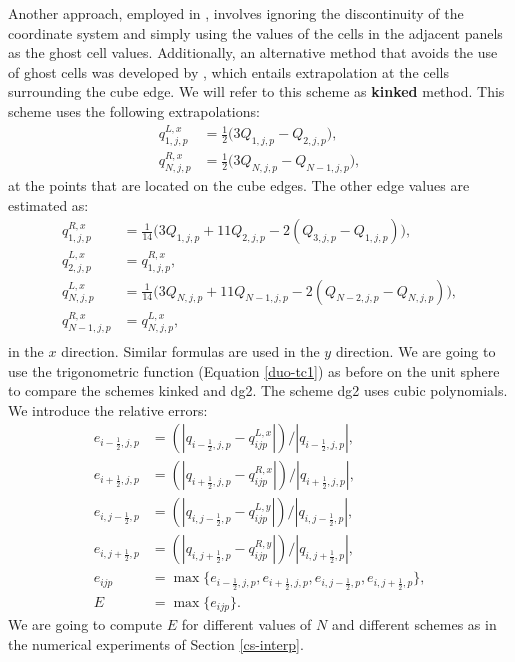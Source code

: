 Another approach, employed in \citet{sadourny:1972}, involves ignoring the
discontinuity of the coordinate system and simply using the values of the cells 
in the adjacent panels as the ghost cell values. 
Additionally, an alternative method that avoids the use of ghost cells was developed by
\citet{putman:2007}, which entails extrapolation at the cells surrounding the cube edge.
We will refer to this scheme as \textbf{kinked} method.
This scheme uses the following extrapolations:
\begin{align*}
	q^{L,x}_{1,j,p} &= \frac{1}{2}\bigg(3Q_{1,j,p} - Q_{2,j,p}\bigg),\\
	q^{R,x}_{N,j,p} &= \frac{1}{2}\bigg(3Q_{N,j,p} - Q_{N-1,j,p}\bigg),
\end{align*}
at the points that are located on the cube edges. The other edge values are estimated as:
\begin{align*}
	q^{R,x}_{1,j,p} &= \frac{1}{14}\bigg(3Q_{1,j,p} + 11Q_{2,j,p} - 2(Q_{3,j,p} - Q_{1,j,p})\bigg),\\
	q^{L,x}_{2,j,p} &= q^{R,x}_{1,j,p},\\
	q^{L,x}_{N,j,p} &= \frac{1}{14}\bigg(3Q_{N,j,p} + 11Q_{N-1,j,p} - 2(Q_{N-2,j,p} - Q_{N,j,p})\bigg),\\
	q^{R,x}_{N-1,j,p} &= q^{L,x}_{N,j,p},\\
\end{align*}
in the $x$ direction. Similar formulas are used in the $y$ direction.
We are going to use the trigonometric function (Equation \eqref{duo-tc1})
as before on the unit sphere to compare the schemes kinked and dg2. The scheme dg2 uses cubic polynomials.
We introduce the relative errors:
\begin{align*}
	e_{{i-\frac{1}{2}},j,p} &= (|q_{{i-\frac{1}{2}},j,p} - q^{L,x}_{ijp}|)/|q_{{i-\frac{1}{2}},j,p}|,\\
	e_{{i+\frac{1}{2}},j,p} &= (|q_{{i+\frac{1}{2}},j,p} - q^{R,x}_{ijp}|)/|q_{{i+\frac{1}{2}},j,p}|,\\
	e_{i,{j-\frac{1}{2}},p} &= (|q_{i,{j-\frac{1}{2}},p} - q^{L,y}_{ijp}|)/|q_{i,{j-\frac{1}{2}},p}|,\\
	e_{i,{j+\frac{1}{2}},p} &= (|q_{i,{j+\frac{1}{2}},p} - q^{R,y}_{ijp}|)/|q_{i,{j+\frac{1}{2}},p}|,\\
	e_{ijp} &= \max\{e_{{i-\frac{1}{2}},j,p}, e_{{i+\frac{1}{2}},j,p} , e_{i,{j-\frac{1}{2}},p}, e_{i,{j+\frac{1}{2}},p} \},\\
	E &= \max \{e_{ijp}\}.
\end{align*}
We are going to compute $E$ for different values of $N$ and different schemes as in the numerical experiments of Section \ref{cs-interp}.

